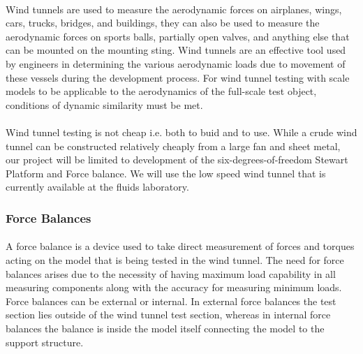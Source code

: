 \paragraph{}Wind tunnels are used to measure the aerodynamic forces on airplanes, wings, cars, trucks, bridges, and buildings, they can also be used to measure the
aerodynamic forces on sports balls, partially open valves, and anything else that can be mounted on the mounting sting. Wind tunnels are an effective tool used by engineers in determining the various aerodynamic loads due to movement of these vessels during the development process.
For wind tunnel testing with scale models to be applicable to the aerodynamics of the full-scale test object, conditions of dynamic similarity must be met.
\paragraph{}Wind tunnel testing is not cheap i.e. both to buid and to use. While a crude wind tunnel can be constructed relatively cheaply from a large fan and
sheet metal, our project will be limited to development of the six-degrees-of-freedom Stewart Platform and Force balance. We will use the low speed wind tunnel that is currently available at the fluids laboratory.
\subsubsection{Force Balances}
\paragraph{}A force balance is a device used to take direct measurement of forces and torques acting on the model that is being tested in the wind tunnel. The need for
force balances arises due to the necessity of having maximum load capability in all measuring components along with the accuracy for measuring minimum loads. Force balances can be external or internal. In external force balances the test section lies outside of the wind tunnel test section, whereas in internal force balances the balance is inside the model itself connecting the model to the support structure.
\cite{fernandes_design_nodate}

